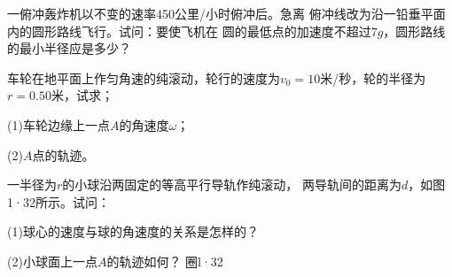 \exercise 一俯冲轰炸机以不变的速率450公里/小时俯冲后。急离
俯冲线改为沿一铅垂平面内的圆形路线飞行。试问：要使飞机在
圆的最低点的加速度不超过$7g$，圆形路线的最小半径应是多少？

\exercise 车轮在地平面上作匀角速的纯滚动，轮行的速度为$v_0=
10$米/秒，轮的半径为$r=0.50$米，试求；

(1)车轮边缘上一点$A$的角速度$\omega$；

(2)$A$点的轨迹。

\exercise 一半径为$r$的小球沿两固定的等高平行导轨作纯滚动，
两导轨间的距离为$d$，如图1·32所示。试问：

(1)球心的速度与球的角速度的关系是怎样的？

(2)小球面上一点$A$的轨迹如何？
圈l·32